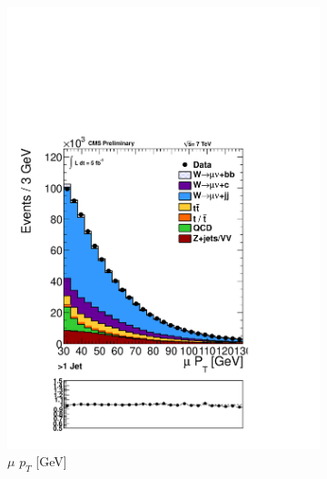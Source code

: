 \begin{figure}[hb]
\centering
  \begin{subfigure}[b]{.45\textwidth}
	\includegraphics[trim = 0mm 52mm 0mm 0mm, clip,width=\textwidth]{images/muonPt.pdf}
	\caption[]{$\mu$    $p_{T}$ [GeV]}
	\end{subfigure}	
   \begin{subfigure}[b]{.45\textwidth}

\end{subfigure}
\end{figure}
